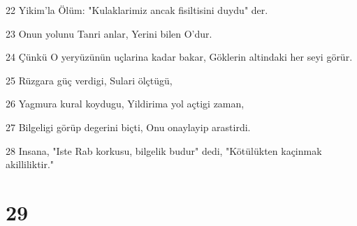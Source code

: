 \par 22 Yikim'la Ölüm: "Kulaklarimiz ancak fisiltisini duydu" der.
\par 23 Onun yolunu Tanri anlar, Yerini bilen O'dur.
\par 24 Çünkü O yeryüzünün uçlarina kadar bakar, Göklerin altindaki her seyi görür.
\par 25 Rüzgara güç verdigi, Sulari ölçtügü,
\par 26 Yagmura kural koydugu, Yildirima yol açtigi zaman,
\par 27 Bilgeligi görüp degerini biçti, Onu onaylayip arastirdi.
\par 28 Insana, "Iste Rab korkusu, bilgelik budur" dedi, "Kötülükten kaçinmak akilliliktir."

\chapter{29}

